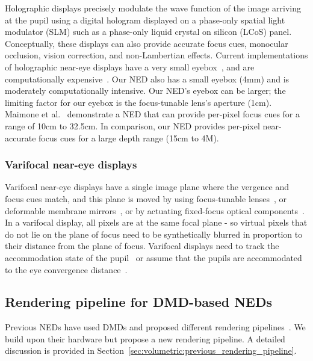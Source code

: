 Holographic displays precisely modulate the wave function of the image arriving at the pupil using a digital hologram displayed on a phase-only spatial light modulator (SLM) such as a phase-only liquid crystal on silicon (LCoS) panel. Conceptually, these displays can also provide accurate focus cues, monocular occlusion, vision correction, and non-Lambertian effects. Current implementations of holographic near-eye displays have a very small eyebox~\cite{Maimone2017Holographic}, and are computationally expensive~\cite{Shi2017Near,Maimone2017Holographic,Matsuda2017focal}. Our NED also has a small eyebox (4mm) and is moderately computationally intensive. Our NED's eyebox can be larger; the limiting factor for our eyebox is the focus-tunable lens's aperture (1cm). Maimone et al.~\cite{Maimone2017Holographic} demonstrate a NED that can provide per-pixel focus cues for a range of 10cm to 32.5cm. In comparison, our NED provides per-pixel near-accurate focus cues for a large depth range (15cm to 4M).

\subsubsection{Varifocal near-eye displays}
\label{sec:volumetric:varifocal_displays}
Varifocal near-eye displays have a single image plane where the vergence and focus cues match, and this plane is moved by using focus-tunable lenses~\cite{Padmanaban2016Optimizing,Liu2008Optical,Konrad2016Novel}, or deformable membrane mirrors~\cite{Dunn2017Wide}, or by actuating fixed-focus optical components~\cite{Aksit2017Near}. In a varifocal display, all pixels are at the same focal plane - so virtual pixels that do not lie on the plane of focus need to be synthetically blurred in proportion to their distance from the plane of focus. Varifocal displays need to track the accommodation state of the pupil~\cite{Padmanaban2016Optimizing} or assume that the pupils are accommodated to the eye convergence distance~\cite{Dunn2017Wide,Aksit2017Near}. 

\subsection{Rendering pipeline for DMD-based NEDs}
Previous NEDs have used DMDs and proposed different rendering pipelines~\cite{Lincoln2016motion,Lincoln2017scene,Hu2014design,Hu2015Design}. We build upon their hardware but propose a new rendering pipeline. A detailed discussion is provided in Section~\ref{sec:volumetric:previous_rendering_pipeline}.

